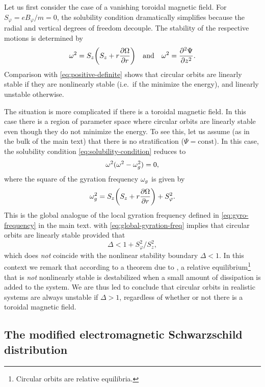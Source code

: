\documentclass[aps,pre,notitlepage,amsmath,amssymb,amsfonts,nobibnotes,nofootinbib,superscriptaddress]{revtex4-1}
\begin{document}
Let us first consider the case of a vanishing toroidal magnetic field. For
$S_\varphi=eB_\varphi/m=0$, the solubility condition
 dramatically simplifies because the radial
and vertical degrees of freedom decouple. The stability of the respective
motions is determined by
\begin{equation}
  \omega^2 = S_z\left(S_z + r\pder{\Omega}{r}\right)
  \quad\textrm{and}\quad
  \omega^2 = \pdder{\Psi}{z}.
\end{equation}
Comparison with \cref{eq:positive-definite} shows that circular orbits are
linearly stable if they are nonlinearly stable (i.e.\ if the minimize the
energy), and linearly unstable otherwise.

The situation is more complicated if there is a toroidal magnetic field. In
this case there is a region of parameter space where circular orbits are
linearly stable even though they do not minimize the energy. To see this, let
us assume (as in the bulk of the main text) that there is no stratification
($\Psi=\mathrm{const}$). In this case, the solubility condition
\cref{eq:solubility-condition} reduces to
\begin{equation}
  \label{eq:solubility-no-stratification}
  \omega^2(\omega^2 - \omg^2) = 0,
\end{equation}
where the square of the gyration frequency $\omega_g$ is given by
\begin{equation}
  \label{eq:global-gyration-freq}
  \omg^2 = S_z\left(S_z + r\pder{\Omega}{r}\right) + S_\varphi^2.
\end{equation}
This is the global analogue of the local gyration frequency defined in
\cref{eq:gyro-frequency} in the main text.
 with \cref{eq:global-gyration-freq}
implies that circular orbits are linearly stable provided that
\begin{equation}
  \Delta < 1 + S_\varphi^2/S_z^2,
\end{equation}
which does \emph{not} coincide with the nonlinear stability boundary
$\Delta<1$. In this context we remark that according to a theorem due to
\citet{Bloch1994}, a relative equilibrium\footnote{Circular orbits are
  relative equilibria.} that is \emph{not} nonlinearly stable is destabilized
when a small amount of dissipation is added to the system. We are thus led to
conclude that circular orbits in realistic systems are always unstable if
$\Delta>1$, regardless of whether or not there is a toroidal magnetic field.

\subsection{The modified electromagnetic Schwarzschild distribution}
\end{document}
